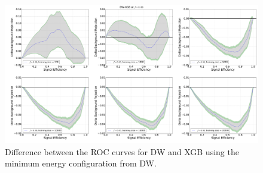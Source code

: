 \begin{figure}[h]
\begin{adjustbox}{center}
\includegraphics[width=\paperwidth]{DW--XGB_GS}
\end{adjustbox}
\caption{Difference between the ROC curves for DW and XGB using the minimum energy configuration from DW.}
\label{fig:SA_XGB_GS_droc}
\end{figure}

